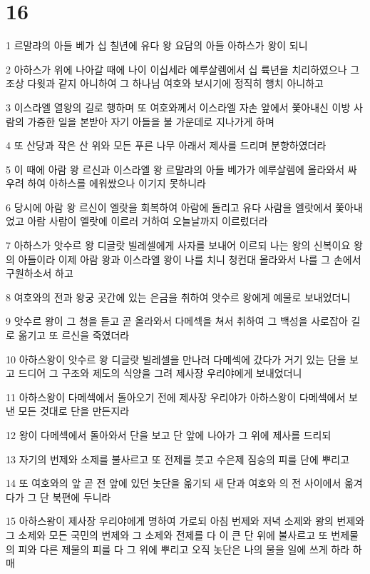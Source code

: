 \chapter{16}

\par 1 르말랴의 아들 베가 십 칠년에 유다 왕 요담의 아들 아하스가 왕이 되니
\par 2 아하스가 위에 나아갈 때에 나이 이십세라 예루살렘에서 십 륙년을 치리하였으나 그 조상 다윗과 같지 아니하여 그 하나님 여호와 보시기에 정직히 행치 아니하고
\par 3 이스라엘 열왕의 길로 행하며 또 여호와께서 이스라엘 자손 앞에서 쫓아내신 이방 사람의 가증한 일을 본받아 자기 아들을 불 가운데로 지나가게 하며
\par 4 또 산당과 작은 산 위와 모든 푸른 나무 아래서 제사를 드리며 분향하였더라
\par 5 이 때에 아람 왕 르신과 이스라엘 왕 르말랴의 아들 베가가 예루살렘에 올라와서 싸우려 하여 아하스를 에워쌌으나 이기지 못하니라
\par 6 당시에 아람 왕 르신이 엘랏을 회복하여 아람에 돌리고 유다 사람을 엘랏에서 쫓아내었고 아람 사람이 엘랏에 이르러 거하여 오늘날까지 이르렀더라
\par 7 아하스가 앗수르 왕 디글랏 빌레셀에게 사자를 보내어 이르되 나는 왕의 신복이요 왕의 아들이라 이제 아람 왕과 이스라엘 왕이 나를 치니 청컨대 올라와서 나를 그 손에서 구원하소서 하고
\par 8 여호와의 전과 왕궁 곳간에 있는 은금을 취하여 앗수르 왕에게 예물로 보내었더니
\par 9 앗수르 왕이 그 청을 듣고 곧 올라와서 다메섹을 쳐서 취하여 그 백성을 사로잡아 길로 옮기고 또 르신을 죽였더라
\par 10 아하스왕이 앗수르 왕 디글랏 빌레셀을 만나러 다메섹에 갔다가 거기 있는 단을 보고 드디어 그 구조와 제도의 식양을 그려 제사장 우리야에게 보내었더니
\par 11 아하스왕이 다메섹에서 돌아오기 전에 제사장 우리야가 아하스왕이 다메섹에서 보낸 모든 것대로 단을 만든지라
\par 12 왕이 다메섹에서 돌아와서 단을 보고 단 앞에 나아가 그 위에 제사를 드리되
\par 13 자기의 번제와 소제를 불사르고 또 전제를 붓고 수은제 짐승의 피를 단에 뿌리고
\par 14 또 여호와의 앞 곧 전 앞에 있던 놋단을 옮기되 새 단과 여호와 의 전 사이에서 옮겨다가 그 단 북편에 두니라
\par 15 아하스왕이 제사장 우리야에게 명하여 가로되 아침 번제와 저녁 소제와 왕의 번제와 그 소제와 모든 국민의 번제와 그 소제와 전제를 다 이 큰 단 위에 불사르고 또 번제물의 피와 다른 제물의 피를 다 그 위에 뿌리고 오직 놋단은 나의 물을 일에 쓰게 하라 하매
